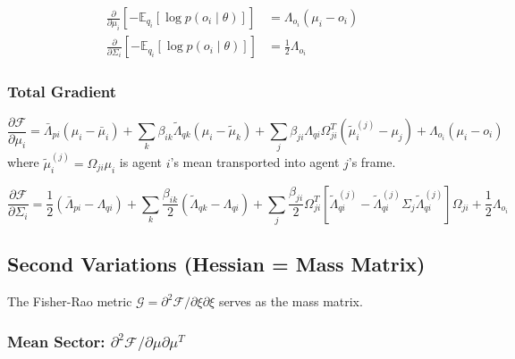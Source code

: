 \documentclass[12pt]{article}
\begin{document}
\begin{align}
\frac{\partial}{\partial \mu_i}\left[-\mathbb{E}_{q_i}[\log p(o_i \mid \theta)]\right] &= \Lambda_{o_i}(\mu_i - o_i) \label{eq:grad_sensory_mu} \\[6pt]
\frac{\partial}{\partial \Sigma_i}\left[-\mathbb{E}_{q_i}[\log p(o_i \mid \theta)]\right] &= \frac{1}{2}\Lambda_{o_i} \label{eq:grad_sensory_sigma}
\end{align}

\subsubsection{Total Gradient}

\begin{equation}
\boxed{
\frac{\partial \mathcal{F}}{\partial \mu_i} = \bar{\Lambda}_{pi}(\mu_i - \bar{\mu}_i) + \sum_k \beta_{ik}\tilde{\Lambda}_{qk}(\mu_i - \tilde{\mu}_k) + \sum_j \beta_{ji}\Lambda_{qi}\Omega_{ji}^T(\tilde{\mu}_i^{(j)} - \mu_j) + \Lambda_{o_i}(\mu_i - o_i)
}
\label{eq:total_gradient_mu}
\end{equation}
%
where $\tilde{\mu}_i^{(j)} = \Omega_{ji}\mu_i$ is agent $i$'s mean transported into agent $j$'s frame.

\begin{equation}
\frac{\partial \mathcal{F}}{\partial \Sigma_i} = \frac{1}{2}(\bar{\Lambda}_{pi} - \Lambda_{qi}) + \sum_k \frac{\beta_{ik}}{2}(\tilde{\Lambda}_{qk} - \Lambda_{qi}) + \sum_j \frac{\beta_{ji}}{2}\Omega_{ji}^T\left[\tilde{\Lambda}_{qi}^{(j)} - \tilde{\Lambda}_{qi}^{(j)}\Sigma_j\tilde{\Lambda}_{qi}^{(j)}\right]\Omega_{ji} + \frac{1}{2}\Lambda_{o_i}
\label{eq:total_gradient_sigma}
\end{equation}

\subsection{Second Variations (Hessian = Mass Matrix)}

The Fisher-Rao metric $\mathcal{G} = \partial^2\mathcal{F}/\partial\xi\partial\xi$ serves as the mass matrix.

\subsubsection{Mean Sector: $\partial^2\mathcal{F}/\partial\mu\partial\mu^T$}
\end{document}
